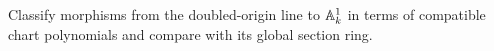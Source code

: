 \begin{problem}\label{chal:vi20-02}
Classify morphisms from the doubled-origin line to $\mathbb A^1_k$ in terms of compatible chart polynomials and compare with its global section ring.
\end{problem}

